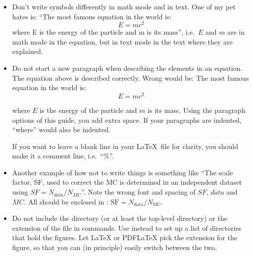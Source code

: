 \begin{itemize}
\item Don't write symbols differently in math mode and in text. One of
  my pet hates is:
  \enquote{The most famous equation in the world is:
  \begin{equation}
    \label{eq:emc1}
    E = m c^{2}
  \end{equation}
  where E is the energy of the particle and m is its mass}, i.e.\ $E$
  and $m$ are in math mode in the equation, but in text mode in the
  text where they are explained.
  
\item Do not start a new paragraph when describing the elements in an equation.
  The equation above is described correctly. Wrong would be:
  The most famous equation in the world is:
  \begin{equation}
    \label{eq:emc2}
    E = m c^{2}
  \end{equation}
  
  \hspace*{1em}where $E$ is the energy of the particle and $m$ is its mass.
  Using the paragraph options of this guide, you add extra space.
  If your paragraphs are indented, \enquote{where} would also be indented.
  
  If you want to leave a blank line in your \LaTeX\ file for clarity,
  you should make it a comment line, i.e.\ \enquote{\%}.
  
\item Another example of how not to write things is something like
  \enquote{The scale factor, SF, used to correct the MC is determined in
  an independent dataset using $SF = N_{data} / N_{MC}$}. Note the
  wrong font and spacing of $SF$, $data$ and $MC$. All should be
  enclosed in : $\text{SF} = N_{\text{data}} / N_{\text{MC}}$.
  
\item Do not include the directory (or at least the top-level directory) 
  or the extension of the file in  commands.
  Use 
  instead to set up a list of directories that hold the
  figures. Let \LaTeX{} or PDF\LaTeX{} pick
  the extension for the figure, so that you can (in principle) easily
  switch between the two.


\end{itemize}
